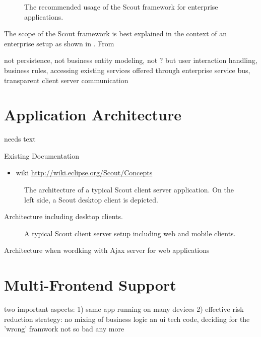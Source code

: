 \documentclass[a4paper,10pt,twoside]{book}
\begin{document}
\begin{figure}
\caption{The recommended usage of the Scout framework for enterprise applications.}
\end{figure}

The scope of the Scout framework is best explained in the context of an enterprise setup as shown in . 
From

not persistence, not business entity modeling, not ?
but user interaction handling, business rules, accessing existing services offered through enterprise service bus, transparent client server communication

\section{Application Architecture}
needs text

\noindent Existing Documentation
\begin{itemize}
  \item wiki \url{http://wiki.eclipse.org/Scout/Concepts}
\end{itemize}

\begin{figure}
\caption{The architecture of a typical Scout client server application.
On the left side, a Scout desktop client is depicted.}
\end{figure}

Architecture including desktop clients.

\begin{figure}
\caption{A typical Scout client server setup including web and mobile clients.}
\end{figure}

Architecture when wordking with Ajax server for web applications

\section{Multi-Frontend Support}

two important aspects: 1) same app running on many devices 2) effective risk reduction strategy: no mixing of business logic an ui tech code, deciding for the 'wrong' framwork not so bad any more
\end{document}
